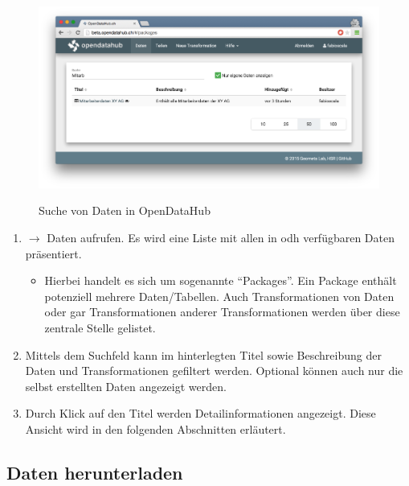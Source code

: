 \begin{figure}[H]
	\centering
	\includegraphics[width=\linewidth]{fig/screenshot-daten-suche}
	\label{fig:sd:screenshot-daten-suche}
	\caption{Suche von Daten in OpenDataHub}
\end{figure}

\begin{enumerate}
\item {} $\to$ Daten aufrufen. Es wird eine Liste mit allen in \acl{odh} verfügbaren Daten präsentiert.
	\begin{itemize}
	\item Hierbei handelt es sich um sogenannte ``Packages''. Ein Package enthält potenziell mehrere Daten/Tabellen. Auch Transformationen von Daten oder gar Transformationen anderer Transformationen werden über diese zentrale Stelle gelistet. 
	\end{itemize}
\item Mittels dem Suchfeld kann im hinterlegten Titel sowie Beschreibung der Daten und Transformationen gefiltert werden. Optional können auch nur die selbst erstellten Daten angezeigt werden.
\item Durch Klick auf den Titel werden Detailinformationen angezeigt. Diese Ansicht wird in den folgenden Abschnitten erläutert.
\end{enumerate}


\subsection{Daten herunterladen}

